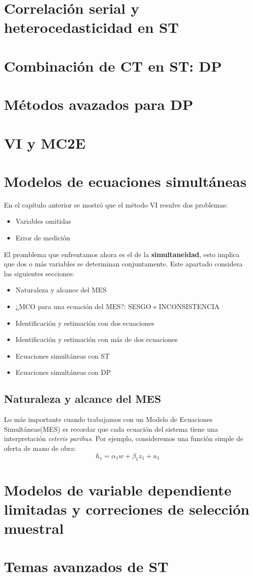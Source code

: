 \documentclass[a4paper,11pt]{book}
\begin{document}
\chapter{Correlación serial y heterocedasticidad en ST}
\chapter{Combinación de CT en ST: DP}
\chapter{Métodos avazados para DP}
\chapter{VI y MC2E}
\chapter{Modelos de ecuaciones simultáneas}
En el capítulo anterior se mostró que el método VI resulve dos problemas:

\begin{itemize}
	\item Variables omitidas
	\item Error de medición
\end{itemize}
El promblema que enfrentamos ahora es el de la \textbf{simultaneidad}, esto implica que dos o más variables se determinan conjuntamente.
Este apartado considera las siguientes secciones:
\begin{itemize}
	\item Naturaleza y alcance del MES
	\item ¿MCO para una ecuación del MES?: SESGO e INCONSISTENCIA
	\item Identificación y estimación con dos ecuaciones
	\item Identificación y estimación con más de dos ecuaciones
	\item Ecuaciones simultáneas con ST
	\item Ecuaciones simultáneas con DP
\end{itemize}

\section{Naturaleza y alcance del MES}

Lo más importante cuando trabajamos con un Modelo de Ecuaciones Simultáneas(MES) es recordar que cada ecuación del sistema tiene una interpretación \textit{ceteris paribus}. Por ejemplo, consideremos una función simple de oferta de mano de obra:
\begin{equation}\label{eq:mh}
h_{s} = \alpha_{1}w + \beta_{1}z_{1} + u_{1}
\end{equation}

\chapter{Modelos de variable dependiente limitadas y correciones de selección muestral}
\chapter{Temas avanzados de ST}
\end{document}

